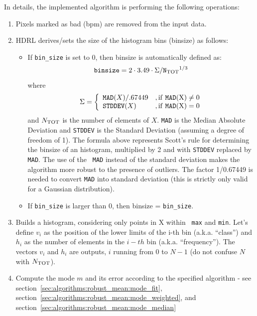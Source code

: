 In details, the implemented algorithm is performing the following
operations:

\begin{enumerate}
\item Pixels marked as bad (bpm) are removed from the input data.
\item HDRL derives/sets the size of the histogram bins (binsize) as
  follows:
  \begin{itemize}
  \item If \verb+bin_size+ is set to 0, then binsize is automatically
    defined as:
   \[
   {\tt binsize} = 2 \cdot 3.49 \cdot \Sigma /{\tt N_{\rm TOT}}^{1/3}
   \]
   where
   \[
   \Sigma = \biggl\{ \begin{array}{ll}
   
    {\tt MAD}(X)/.67449 & {\rm,  if\ {\tt MAD} (X) \ne 0} \\
      {\tt STDDEV}(X)   & {\rm,  if\ {\tt MAD} (X) = 0} \\
   \end{array}
   \]
   and $N_{\rm TOT}$ is the number of elements of $X$. {\tt MAD} is the
   Median Absolute Deviation and {\tt STDDEV} is the Standard Deviation
   (assuming a degree of freedom of 1). The formula above represents
   Scott's rule for determining the binsize of an histogram, multiplied
   by 2 and with {\tt STDDEV} replaced by {\tt MAD}. The use of the {\tt
     MAD} instead of the standard deviation makes the algorithm more
   robust to the presence of outliers. The factor 1/0.67449 is needed to
   convert {\tt MAD} into standard deviation (this is strictly only valid
   for a Gaussian distribution).
   \item If \verb+bin_size+ is larger than 0, then binsize =
     \verb+bin_size+.
  \end{itemize}
\item Builds a histogram, considering only points in X within {\tt
  max} and {\tt min}. Let's define $v_i$ as the position of the lower
  limits of the i-th bin (a.k.a. ``class'') and $h_i$ as the number of
  elements in the $i-th$ bin (a.k.a. ``frequency''). The vectors $v_i$
  and $h_i$ are outputs, $i$ running from 0 to $N-1$ (do not confuse
  $N$ with $N_{\rm TOT}$).
\item Compute the mode $m$ and its error according to the specified
  algorithm - see
  section~\ref{sec:algorithms:robust_mean:mode_fit},
  section~\ref{sec:algorithms:robust_mean:mode_weighted}, and 
  section~\ref{sec:algorithms:robust_mean:mode_median}
\end{enumerate}

